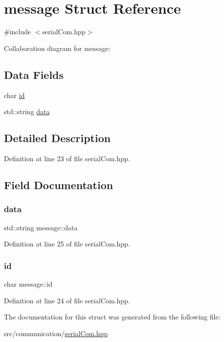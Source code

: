 \hypertarget{structmessage}{}\section{message Struct Reference}
\label{structmessage}


{\ttfamily \#include $<$serial\+Com.\+hpp$>$}



Collaboration diagram for message\+:
\subsection*{Data Fields}
\begin{DoxyCompactItemize}
\item 
char \hyperlink{structmessage_ac48b062c8da4fd37d890de208b77d89c}{id}
\item 
std\+::string \hyperlink{structmessage_a4dc35b00aa35191f1406c5a4657288a2}{data}
\end{DoxyCompactItemize}


\subsection{Detailed Description}


Definition at line 23 of file serial\+Com.\+hpp.



\subsection{Field Documentation}
\mbox{\label{structmessage_a4dc35b00aa35191f1406c5a4657288a2}} 
\subsubsection{\texorpdfstring{data}{data}}
{\footnotesize\ttfamily std\+::string message\+::data}



Definition at line 25 of file serial\+Com.\+hpp.

\mbox{\label{structmessage_ac48b062c8da4fd37d890de208b77d89c}} 
\subsubsection{\texorpdfstring{id}{id}}
{\footnotesize\ttfamily char message\+::id}



Definition at line 24 of file serial\+Com.\+hpp.



The documentation for this struct was generated from the following file\+:\begin{DoxyCompactItemize}
\item 
src/communication/\hyperlink{serial_com_8hpp}{serial\+Com.\+hpp}\end{DoxyCompactItemize}
